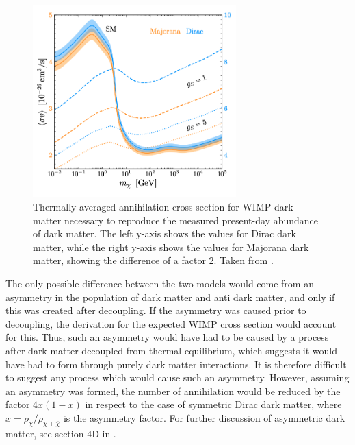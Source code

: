 \begin{figure}[h!]
    \centering
    \includegraphics[width=0.7\textwidth]{figures/sigma_v_dirac_majorana_dm.png}
    \caption{Thermally averaged annihilation cross section for WIMP dark matter necessary to reproduce the measured present-day abundance of dark matter. The left y-axis shows the values for Dirac dark matter, while the right y-axis shows the values for Majorana dark matter, showing the difference of a factor 2. Taken from \cite{}. }
    \label{fig:sigmaV_DiracvsMajorana}
\end{figure}

The only possible difference between the two models would come from an asymmetry in the population of dark matter and anti dark matter, and only if this was created after decoupling. If the asymmetry was caused prior to decoupling, the derivation for the expected WIMP cross section would account for this. Thus, such an asymmetry would have had to be caused by a process after dark matter decoupled from thermal equilibrium, which suggests it would have had to form through purely dark matter interactions. It is therefore difficult to suggest any process which would cause such an asymmetry. However, assuming an asymmetry was formed, the number of annihilation would be reduced by the factor $4x(1-x)$ in respect to the case of symmetric Dirac dark matter, where $x = \rho_\chi / \rho_{\chi + \overline{\chi}}$ is the asymmetry factor. For further discussion of asymmetric dark matter, see section 4D in \cite{BAER20151}. 

